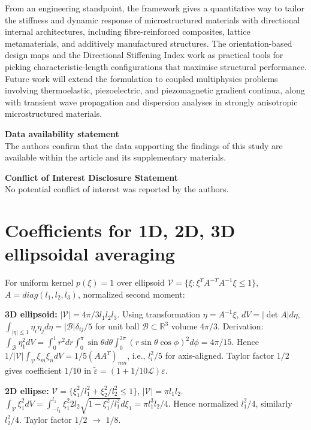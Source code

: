 \documentclass[final,3p,times,fleqn]{elsarticle}
\newcommand{\rev}[1]{\textcolor{revcolor}{#1}}
\begin{document}
From an engineering standpoint, the framework gives a quantitative way
to tailor the stiffness and dynamic response of microstructured
materials with directional internal architectures, including
fibre-reinforced composites, lattice metamaterials, and additively
manufactured structures. The orientation-based design maps and the
Directional Stiffening Index work as practical tools for picking
characteristic-length configurations that maximise structural
performance. Future work will extend the formulation to coupled
multiphysics problems involving thermoelastic, piezoelectric, and
piezomagnetic gradient continua, along with transient wave propagation
and dispersion analyses in strongly anisotropic microstructured
materials.

\noindent\textbf{\large{Data availability statement}}\\
The authors confirm that the data supporting the findings of this study
are available within the article and its supplementary materials.

\noindent\textbf{\large{Conflict of Interest Disclosure Statement}}\\
No potential conflict of interest was reported by the authors.

\appendix
\section{Coefficients for 1D, 2D, 3D ellipsoidal averaging}
\label{app:coeffs}
\rev{For uniform kernel $p(\xi)=1$ over ellipsoid $\mathcal{V}=\{\xi: \xi^T A^{-T}A^{-1}\xi\le1\}$, $A=diag(l_1,l_2,l_3)$, normalized second moment:}

\rev{\textbf{3D ellipsoid:} $|\mathcal{V}|=4\pi/3 l_1l_2l_3$. Using transformation $\eta=A^{-1}\xi$, $dV=|\det A|d\eta$, $\int_{|\eta|\le1}\eta_i\eta_j d\eta = |\mathcal{B}|\delta_{ij}/5$ for unit ball $\mathcal{B}\subset\mathbb{R}^3$ volume $4\pi/3$. Derivation: $\int_{\mathcal{B}} \eta_1^2 dV = \int_0^1 r^2 dr \int_0^\pi \sin\theta d\theta \int_0^{2\pi} (r\sin\theta\cos\phi)^2 d\phi = 4\pi/15$. Hence $1/|\mathcal{V}|\int_{\mathcal{V}}\xi_m\xi_n dV = 1/5 (AA^T)_{mn}$, i.e., $l_i^2/5$ for axis-aligned. Taylor factor $1/2$ gives coefficient $1/10$ in $\tilde{\varepsilon}=(1+1/10\mathcal{L})\varepsilon$.}

\rev{\textbf{2D ellipse:} $\mathcal{V}=\{\xi_1^2/l_1^2+\xi_2^2/l_2^2\le1\}$, $|\mathcal{V}|=\pi l_1l_2$. $\int_{\mathcal{V}} \xi_1^2 dV = \int_{-l_1}^{l_1} \xi_1^2 2 l_2\sqrt{1-\xi_1^2/l_1^2} d\xi_1 = \pi l_1^3 l_2/4$. Hence normalized $l_1^2/4$, similarly $l_2^2/4$. Taylor factor $1/2$ $\rightarrow$ $1/8$.}
\end{document}

